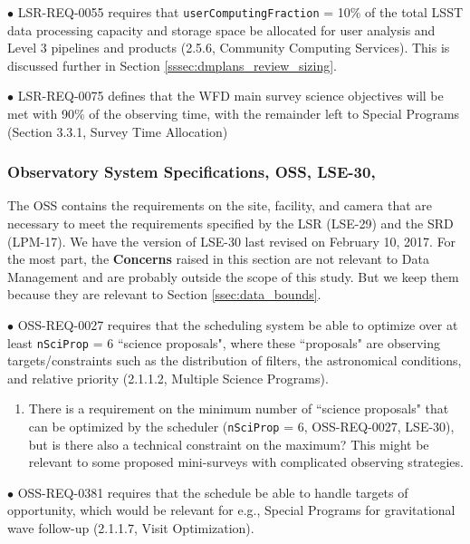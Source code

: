 \documentclass[DM,lsstdraft,toc]{lsstdoc}
\begin{document}
$\bullet$ LSR-REQ-0055 requires that {\tt userComputingFraction} = 10\% of the total LSST data processing capacity and storage space be allocated for user analysis and Level 3 pipelines and products (2.5.6, Community Computing Services). This is discussed further in Section \ref{sssec:dmplans_review_sizing}.

$\bullet$ LSR-REQ-0075 defines that the WFD main survey science objectives will be met with 90\% of the observing time, with the remainder left to Special Programs (Section 3.3.1, Survey Time Allocation) 


\subsubsection{Observatory System Specifications, OSS, LSE-30, \cite{LSE-30}}\label{sssec:dmplans_review_oss}

The OSS contains the requirements on the site, facility, and camera that are necessary to meet the requirements specified by the LSR (LSE-29) and the SRD (LPM-17). We have the version of LSE-30 last revised on February 10, 2017. For the most part, the {\bf Concerns} raised in this section are not relevant to Data Management and are probably outside the scope of this study. But we keep them because they are relevant to Section \ref{ssec:data_bounds}. 

$\bullet$ OSS-REQ-0027 requires that the scheduling system be able to optimize over at least {\tt nSciProp} = 6 ``science proposals", where these ``proposals" are observing targets/constraints such as the distribution of filters, the astronomical conditions, and relative priority (2.1.1.2, Multiple Science Programs). 
\begin{enumerate}[topsep=-10pt,after=\vspace{10pt},label= \textbf{Concern \Roman*.},resume] \item \label{OSS-1} There is a requirement on the minimum number of ``science proposals" that can be optimized by the scheduler ({\tt nSciProp} = 6, OSS-REQ-0027, LSE-30), but is there also a technical constraint on the maximum? This might be relevant to some proposed mini-surveys with complicated observing strategies. \end{enumerate}

$\bullet$ OSS-REQ-0381 requires that the schedule be able to handle targets of opportunity, which would be relevant for e.g., Special Programs for gravitational wave follow-up (2.1.1.7, Visit Optimization).
\end{document}
